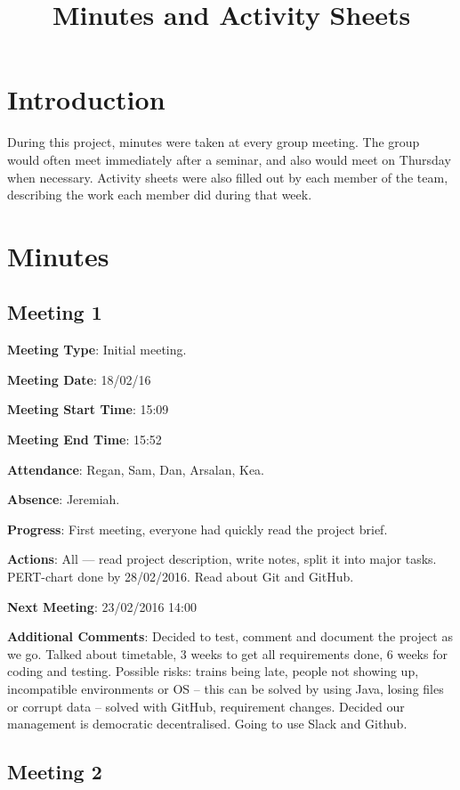 \documentclass[11pt]{article}
\title{Minutes and Activity Sheets}
\date{}
\begin{document}
\maketitle
\tableofcontents
\newpage
\section{Introduction}

During this project, minutes were taken at every group meeting. The group would often meet immediately after a seminar, and also would meet
on Thursday when necessary. Activity sheets were also filled out by each member of the team, describing the work each member did during that week. 

\newpage
\section{Minutes}

\subsection{Meeting 1}

\textbf{Meeting Type}: Initial meeting.

\textbf{Meeting Date}: 18/02/16

\textbf{Meeting Start Time}: 15:09

\textbf{Meeting End Time}: 15:52

\textbf{Attendance}: Regan, Sam, Dan, Arsalan, Kea.

\textbf{Absence}: Jeremiah.

\textbf{Progress}: First meeting, everyone had quickly read the project brief.

\textbf{Actions}: All --- read project description, write notes, split it into major tasks. PERT-chart done by 28/02/2016. Read about Git and GitHub.

\textbf{Next Meeting}: 23/02/2016 14:00

\textbf{Additional Comments}: Decided to test, comment and document the project as we go. Talked about timetable, 3 weeks to get all requirements done, 6 weeks for coding and testing. Possible risks: trains being late, people not showing up, incompatible environments or OS – this can be solved by using Java, losing files or corrupt data – solved with GitHub, requirement changes. Decided our management is democratic decentralised. Going to use Slack and Github.

\subsection{Meeting 2}
\end{document}
